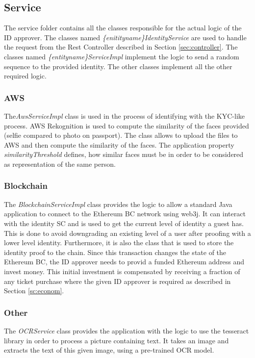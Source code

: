 \subsection{Service}
The service folder contains all the classes responsible for the actual logic of the ID approver. The classes named \textit{\{enitityname\}IdentityService} are used to handle the request from the Rest Controller described in Section \ref{sec:controller}. The classes named \textit{\{entityname\}ServiceImpl} implement the logic to send a random sequence to the provided identity. The other classes implement all the other required logic.

\subsubsection{AWS}
The\textit{AwsServiceImpl} class is used in the process of identifying with the KYC-like process. AWS Rekognition is used to compute the similarity of the faces provided (selfie compared to photo on passport). The class allows to upload the files to AWS and then compute the similarity of the faces. The application property \textit{similarityThreshold} defines, how similar faces must be in order to be considered as representation of the same person.

\subsubsection{Blockchain}
The \textit{BlockchainServiceImpl} class provides the logic to allow a standard Java application to connect to the Ethereum BC network using web3j. It can interact with the identity SC and is used to get the current level of identity a guest has. This is done to avoid downgrading an existing level of a user after proofing with a lower level identity. Furthermore, it is also the class that is used to store the identity proof to the chain. Since this transaction changes the state of the Ethereum BC, the ID approver needs to provid a funded Ethereum address and invest money. This initial investment is compensated by receiving a fraction of any ticket purchase where the given ID approver is required as described in Section \ref{sc:econom}.

\subsubsection{Other}
The \textit{OCRService} class provides the application with the logic to use the tesseract library in order to process a picture containing text. It takes an image and extracts the text of this given image, using a pre-trained OCR model.

